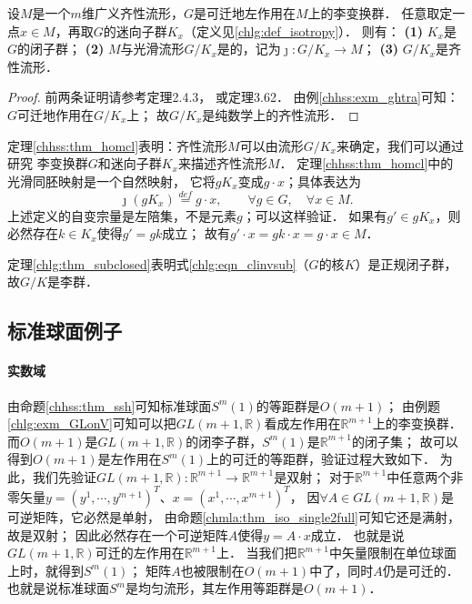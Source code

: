 

\begin{theorem}\label{chhss:thm_homcl}
    设$M$是一个$m$维广义齐性流形，$G$是可迁地左作用在$M$上的李变换群．
    任意取定一点$x \in M$，再取$G$的迷向子群$K_x$（定义见\ref{chlg:def_isotropy}）．
    则有：    
    {\bfseries (1)} $K_x$是$G$的闭子群；    
    {\bfseries (2)} $M$与光滑流形$G/K_x$是的，记为$\jmath : G/K_x \to M$；      
    {\bfseries (3)} $G/K_x$是齐性流形．
\end{theorem}
\begin{proof}
    前两条证明请参考\parencite{helgason-2001}定理2.4.3，
    或\parencite{warner-1983-FDMLG}定理3.62．
    由例\ref{chhss:exm_ghtra}可知：$G$可迁地作用在$G/K_x$上；
    故$G/K_x$是纯数学上的齐性流形．
\end{proof}

定理\ref{chhss:thm_homcl}表明：齐性流形$M$可以由流形$G/K_x$来确定，我们可以通过研究
李变换群$G$和迷向子群$K_x$来描述齐性流形$M$．
定理\ref{chhss:thm_homcl}中的光滑同胚映射是一个{\heiti 自然映射}，
它将$g K_x$变成$g \cdot x$；具体表达为
\begin{equation}\label{chhss:eqn_jnm}
    \jmath(g K_x)\overset{def}{=}   g\cdot x, \qquad \forall g\in G ,\quad \forall x\in M.
\end{equation}
上述定义的自变宗量是左陪集，不是元素$g$；可以这样验证．
如果有$g'\in g K_x$，则必然存在$k\in K_x$使得$g'=g k$成立；
故有$g'\cdot x = gk\cdot x=g\cdot x \in M$．

定理\ref{chlg:thm_subclosed}表明式\eqref{chlg:eqn_clinvsub}（$G$的核$K$）是正规闭子群，
故$G/K$是李群．





\subsection{标准球面例子}\label{chhss:sec_sphere}
\paragraph{实数域}
由命题\ref{chhss:thm_ssh}可知标准球面$S^m(1)$的等距群是$O(m+1)$；
由例题\ref{chlg:exm_GLonV}可知可以把$GL(m+1,\mathbb{R})$看成左作用在$\mathbb{R}^{m+1}$上的李变换群．
而$O(m+1)$是$GL(m+1,\mathbb{R})$的闭李子群，$S^m(1)$是$\mathbb{R}^{m+1}$的闭子集；
故可以得到$O(m+1)$是左作用在$S^m(1)$上的可迁的等距群，验证过程大致如下．
为此，我们先验证$GL(m+1,\mathbb{R}):\mathbb{R}^{m+1}\to \mathbb{R}^{m+1}$是双射；
对于$\mathbb{R}^{m+1}$中任意两个非零矢量$y=(y^1,\cdots,y^{m+1})^T$、$x=(x^1,\cdots,x^{m+1})^T$，
因$\forall A\in GL(m+1,\mathbb{R})$是可逆矩阵，它必然是单射，
由命题\ref{chmla:thm_iso_single2full}可知它还是满射，故是双射；
因此必然存在一个可逆矩阵$A$使得$y=A\cdot x$成立．
也就是说$GL(m+1,\mathbb{R})${\kaishu 可迁的}左作用在$\mathbb{R}^{m+1}$上．
当我们把$\mathbb{R}^{m+1}$中矢量限制在单位球面上时，就得到$S^m(1)$；
矩阵$A$也被限制在$O(m+1)$中了，同时$A$仍是可迁的．
也就是说标准球面$S^m$是{\kaishu 均匀流形}，其左作用等距群是$O(m+1)$．

